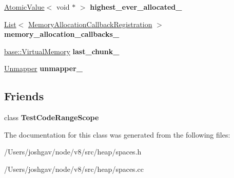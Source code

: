 \begin{DoxyCompactItemize}
\item 
\hyperlink{classv8_1_1internal_1_1_atomic_value}{Atomic\+Value}$<$ void $\ast$ $>$ {\bfseries highest\+\_\+ever\+\_\+allocated\+\_\+}\hypertarget{classv8_1_1internal_1_1_memory_allocator_a652d2ade164fef1525d4263ac9838347}{}\label{classv8_1_1internal_1_1_memory_allocator_a652d2ade164fef1525d4263ac9838347}

\item 
\hyperlink{classv8_1_1internal_1_1_list}{List}$<$ \hyperlink{structv8_1_1internal_1_1_memory_allocator_1_1_memory_allocation_callback_registration}{Memory\+Allocation\+Callback\+Registration} $>$ {\bfseries memory\+\_\+allocation\+\_\+callbacks\+\_\+}\hypertarget{classv8_1_1internal_1_1_memory_allocator_a0e113300a0c7d43701d63540e17439c4}{}\label{classv8_1_1internal_1_1_memory_allocator_a0e113300a0c7d43701d63540e17439c4}

\item 
\hyperlink{classv8_1_1base_1_1_virtual_memory}{base\+::\+Virtual\+Memory} {\bfseries last\+\_\+chunk\+\_\+}\hypertarget{classv8_1_1internal_1_1_memory_allocator_ae16db4da99ca7219a4b9c1ac9de8351a}{}\label{classv8_1_1internal_1_1_memory_allocator_ae16db4da99ca7219a4b9c1ac9de8351a}

\item 
\hyperlink{classv8_1_1internal_1_1_memory_allocator_1_1_unmapper}{Unmapper} {\bfseries unmapper\+\_\+}\hypertarget{classv8_1_1internal_1_1_memory_allocator_a3077cf805d1e4e124f9b76dc5cc522cc}{}\label{classv8_1_1internal_1_1_memory_allocator_a3077cf805d1e4e124f9b76dc5cc522cc}

\end{DoxyCompactItemize}
\subsection*{Friends}
\begin{DoxyCompactItemize}
\item 
class {\bfseries Test\+Code\+Range\+Scope}\hypertarget{classv8_1_1internal_1_1_memory_allocator_ad80dbbca5b659bae6d1837b48e6df17f}{}\label{classv8_1_1internal_1_1_memory_allocator_ad80dbbca5b659bae6d1837b48e6df17f}

\end{DoxyCompactItemize}


The documentation for this class was generated from the following files\+:\begin{DoxyCompactItemize}
\item 
/\+Users/joshgav/node/v8/src/heap/spaces.\+h\item 
/\+Users/joshgav/node/v8/src/heap/spaces.\+cc\end{DoxyCompactItemize}
